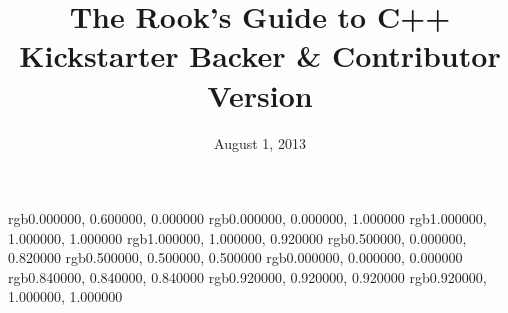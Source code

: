 \documentclass[11pt,final]{book}
\title{The Rook's Guide to C++
 \\ \small{Kickstarter Backer \& Contributor Version}
      }
\date{August 1, 2013}
\begin{document}
 \maketitle
 \tableofcontents


 \definecolor{CommentColor}                    {rgb}{0.000000, 0.600000, 0.000000}
 \definecolor{KeywordStyleColor}               {rgb}{0.000000, 0.000000, 1.000000}
 \definecolor{ListingBgColor}                  {rgb}{1.000000, 1.000000, 1.000000}
 \definecolor{ListingFrameColor}               {rgb}{1.000000, 1.000000, 0.920000}
 \definecolor{LiteralStringColor}              {rgb}{0.500000, 0.000000, 0.820000}
 \definecolor{NumStyleColor}                   {rgb}{0.500000, 0.500000, 0.500000}
 \definecolor{RuleColor}                       {rgb}{0.000000, 0.000000, 0.000000}
 \definecolor{RuleSepColor}                    {rgb}{0.840000, 0.840000, 0.840000}
 \definecolor{ShadowBoxFrameColor}             {rgb}{0.920000, 0.920000, 0.920000}
 \definecolor{ShadowBoxColor}                  {rgb}{0.920000, 1.000000, 1.000000}
\end{document}
